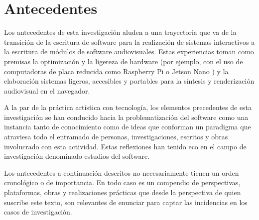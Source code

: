 \chapter{Antecedentes}



Los antecedentes de esta investigación aluden a una trayectoria que va de la transición de la escritura de software para la realización de sistemas interactivos a la escritura de módulos de software audiovisuales. Estas experiencias toman como premisas la optimización y la ligereza de hardware (por ejemplo, con el uso de computadoras de placa reducida como Raspberry Pi o Jetson Nano ) y la elaboración sistemas ligeros, accesibles y portables para la síntesis y renderización audiovisual en el navegador.

A la par de la práctica artística con tecnología, los elementos precedentes de esta investigación se han conducido hacia la problematización del software como una instancia tanto de conocimiento como de ideas que conforman un paradigma que atraviesa todo el entramado de personas, investigaciones, escritos y obras involucrado con esta actividad. Estas reflexiones han tenido eco en el campo de investigación denominado estudios del software.

Los antecedentes a continuación descritos no necesariamente tienen un orden cronológico o de importancia. En todo caso es un compendio de perspectivas, plataformas, obras y realizaciones prácticas que desde la perspectiva de quien suscribe este texto, son relevantes de enunciar para captar las incidencias en los casos de investigación. 



